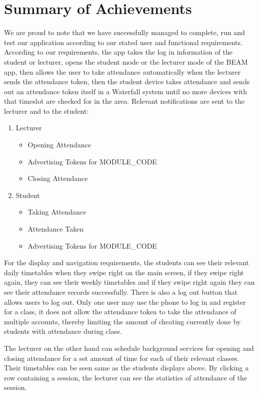 \documentclass[../report.tex]{subfiles}
\begin{document}
\section{Summary of Achievements}
We are proud to note that we have successfully managed to complete, run and test our application according to our stated user and functional requirements. According to our requirements, the app takes the log in information of the student or lecturer, opens the student mode or the lecturer mode of the BEAM app, then allows the user to take attendance automatically when the lecturer sends the attendance token, then the student device takes attendance and sends out an attendance token itself in a Waterfall system until no more devices with that timeslot are checked for in the area. Relevant notifications are sent to the lecturer and to the student:
\begin{enumerate}
\item Lecturer
\begin{itemize}
\item Opening Attendance
\item Advertising Tokens for MODULE\_CODE
\item Closing Attendance
\end{itemize}
\item Student
\begin{itemize}
\item Taking Attendance
\item Attendance Taken
\item Advertising Tokens for MODULE\_CODE
\end{itemize}
\end{enumerate}

For the display and navigation requirements, the students can see their relevant daily timetables when they swipe right on the main screen, if they swipe right again, they can see their weekly timetables and if they swipe right again they can see their attendance records successfully. There is also a log out button that allows users to log out. Only one user may use the phone to log in and register for a class, it does not allow the attendance token to take the attendance of multiple accounts, thereby limiting the amount of cheating currently done by students with attendance during class. 

The lecturer on the other hand can schedule background services for opening and closing attendance for a set amount of time for each of their relevant classes. Their timetables can be seen same as the students displays above. By clicking a row containing a session, the lecturer can see the statistics of attendance of the session.
\end{document}
